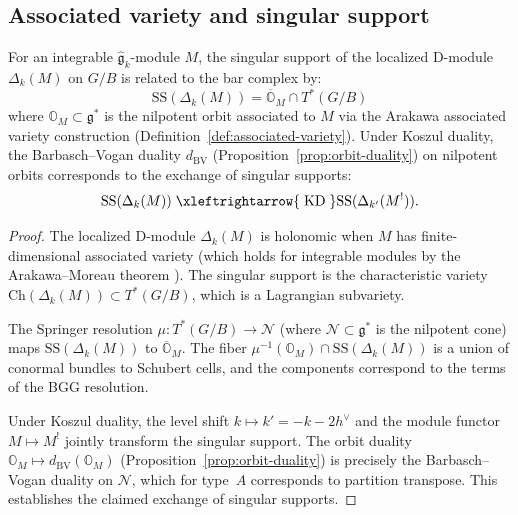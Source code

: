 \subsection{Associated variety and singular support}

\begin{proposition}
\label{prop:bar-singular-support}
For an integrable $\widehat{\mathfrak{g}}_k$-module $M$, the
singular support of the localized D-module $\Delta_k(M)$ on $G/B$
is related to the bar complex by:
\[
\mathrm{SS}(\Delta_k(M))
= \overline{\mathbb{O}}_M \cap T^*(G/B)
\]
where $\mathbb{O}_M \subset \mathfrak{g}^*$ is the nilpotent orbit
associated to $M$ via the Arakawa associated variety construction
\textup{(}Definition~\textup{\ref{def:associated-variety})}.
Under Koszul duality, the Barbasch--Vogan duality $d_{\mathrm{BV}}$
\textup{(}Proposition~\textup{\ref{prop:orbit-duality})} on nilpotent
orbits corresponds to the exchange of singular supports:
\[
\mathrm{SS}(\Delta_k(M))
\;\xleftrightarrow{\;\mathrm{KD}\;}
\mathrm{SS}(\Delta_{k'}(M^!)).
\]
\end{proposition}

\begin{proof}
The localized D-module $\Delta_k(M)$ is holonomic when $M$ has
finite-dimensional associated variety (which holds for integrable
modules by the Arakawa--Moreau theorem \cite{arakawa-lectures}).
The singular support is the characteristic variety
$\mathrm{Ch}(\Delta_k(M)) \subset T^*(G/B)$, which is a
Lagrangian subvariety.

The Springer resolution $\mu: T^*(G/B) \to \mathcal{N}$
(where $\mathcal{N} \subset \mathfrak{g}^*$ is the nilpotent cone)
maps $\mathrm{SS}(\Delta_k(M))$ to $\overline{\mathbb{O}}_M$.
The fiber $\mu^{-1}(\mathbb{O}_M) \cap \mathrm{SS}(\Delta_k(M))$
is a union of conormal bundles to Schubert cells, and the
components correspond to the terms of the BGG resolution.

Under Koszul duality, the level shift
$k \mapsto k' = -k - 2h^\vee$ and the module functor
$M \mapsto M^!$ jointly transform the singular support.
The orbit duality $\mathbb{O}_M \mapsto d_{\mathrm{BV}}(\mathbb{O}_M)$
(Proposition~\ref{prop:orbit-duality}) is precisely the
Barbasch--Vogan duality on $\mathcal{N}$, which for type~$A$
corresponds to partition transpose.  This establishes the claimed
exchange of singular supports.
\end{proof}

